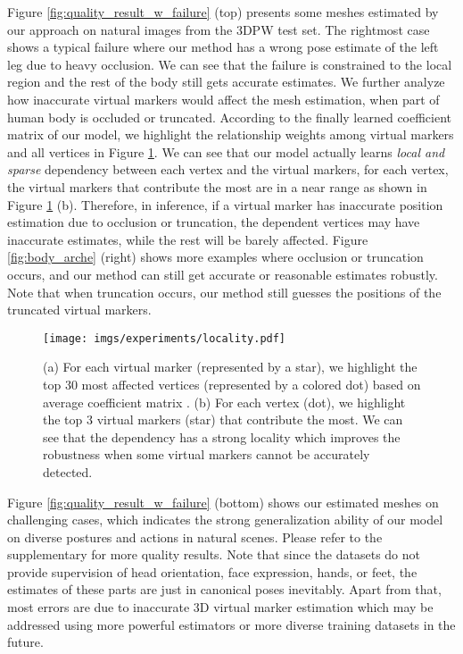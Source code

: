 \label{subsec:quality}
Figure \ref{fig:quality_result_w_failure} (top) presents some meshes estimated by our approach on natural images from the 3DPW test set. The rightmost case shows a typical failure where our method has a wrong pose estimate of the left leg due to heavy occlusion. We can see that the failure is constrained to the local region and the rest of the body still gets accurate estimates. We further analyze how inaccurate virtual markers would affect the mesh estimation, \ie when part of human body is occluded or truncated. According to the finally learned coefficient matrix  of our model, we highlight the relationship weights among virtual markers and all vertices in Figure \ref{fig:locality}. We can see that our model actually learns \emph{local and sparse} dependency between each vertex and the virtual markers, \eg for each vertex, the virtual markers that contribute the most are in a near range as shown in Figure \ref{fig:locality} (b). Therefore, in inference, if a virtual marker has inaccurate position estimation due to occlusion or truncation, the dependent vertices may have inaccurate estimates, while the rest will be barely affected. Figure \ref{fig:body_arche} (right) shows more examples where occlusion or truncation occurs, and our method can still get accurate or reasonable estimates robustly. Note that when truncation occurs, our method still guesses the positions of the truncated virtual markers.

\begin{figure}[t]
	\centering
	\texttt{[image: imgs/experiments/locality.pdf]}
	\caption{(a) For each virtual marker (represented by a star), we highlight the top 30 most affected vertices (represented by a colored dot) based on average coefficient matrix . (b) For each vertex (dot), we highlight the top 3 virtual markers (star) that contribute the most. We can see that the dependency has a strong locality which improves the robustness when some virtual markers cannot be accurately detected. }
	\label{fig:locality}
\vspace{-0.3cm}
\end{figure}

Figure \ref{fig:quality_result_w_failure} (bottom) shows our estimated meshes on challenging cases, which indicates the strong generalization ability of our model on diverse postures and actions in natural scenes. Please refer to the supplementary for more quality results. Note that since the datasets do not provide supervision of head orientation, face expression, hands, or feet, the estimates of these parts are just in canonical poses inevitably. Apart from that, most errors are due to inaccurate 3D virtual marker estimation which may be addressed using more powerful estimators or more diverse training datasets in the future. 






